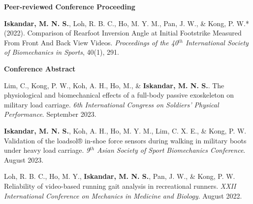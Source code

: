 \documentclass[../main.tex]{subfiles}
\begin{document}
        \textbf{Peer-reviewed Conference Proceeding}
        \def\labelprefix{C}
        \begin{etaremune}
            \item\label{conference: isbs2022} {\textbf{Iskandar, M. N. S.}, Loh, R. B. C., Ho, M. Y. M., Pan, J. W., \& Kong, P. W.* (2022). Comparison of Rearfoot Inversion Angle at Initial Footstrike Measured From Front And Back View Videos. \textit{Proceedings of the 40$^{th}$ International Society of Biomechanics in Sports}, 40(1), 291. \href{https://commons.nmu.edu/isbs/vol40/iss1/70/}{\faFilePdfO}}
        \end{etaremune}

        \textbf{Conference Abstract}
        \def\labelprefix{CA}
        \begin{etaremune}
            \item {Lim, C., Kong, P. W., Koh, A. H., Ho, M., \& \textbf{Iskandar, M. N. S.}. The physiological and biomechanical effects of a full-body passive exoskeleton
            on military load carriage. \textit{6th International Congress on Soldiers' Physical Performance}. September 2023. {\href{https://cdn.asp.events/CLIENT_CLDD_9BDAB70C_5056_B733_4934A7872C9C46B0/sites/dsei-2023/media/ICSPP_program_book.pdf}{\faFilePdfO}}}

            \item {\textbf{Iskandar, M. N. S.}, Koh, A. H., Ho, M. Y. M., Lim, C. X. E., \& Kong, P. W. Validation of the loadsol® in-shoe force sensors during walking in military boots under heavy load carriage. \textit{9$^{th}$ Asian Society of Sport Biomechanics Conference}. August 2023. }
            
            \item {Loh, R. B. C., Ho, M. Y., \textbf{Iskandar, M. N. S.}, Pan, J. W., \& Kong, P. W. Reliability of video-based running gait analysis in recreational runners. \textit{XXII International Conference on Mechanics in Medicine and Biology}. August 2022.}
        \end{etaremune}
        
\end{document}
